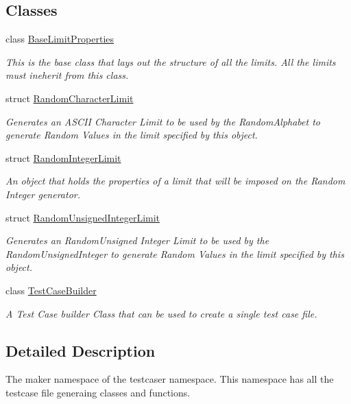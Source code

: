 \subsection*{Classes}
\begin{DoxyCompactItemize}
\item 
class \mbox{\hyperlink{classtestcaser_1_1maker_1_1BaseLimitProperties}{Base\+Limit\+Properties}}
\begin{DoxyCompactList}\small\item\em This is the base class that lays out the structure of all the limits. All the limits must ineherit from this class. \end{DoxyCompactList}\item 
struct \mbox{\hyperlink{structtestcaser_1_1maker_1_1RandomCharacterLimit}{Random\+Character\+Limit}}
\begin{DoxyCompactList}\small\item\em Generates an A\+S\+C\+II Character Limit to be used by the Random\+Alphabet to generate Random Values in the limit specified by this object. \end{DoxyCompactList}\item 
struct \mbox{\hyperlink{structtestcaser_1_1maker_1_1RandomIntegerLimit}{Random\+Integer\+Limit}}
\begin{DoxyCompactList}\small\item\em An object that holds the properties of a limit that will be imposed on the Random Integer generator. \end{DoxyCompactList}\item 
struct \mbox{\hyperlink{structtestcaser_1_1maker_1_1RandomUnsignedIntegerLimit}{Random\+Unsigned\+Integer\+Limit}}
\begin{DoxyCompactList}\small\item\em Generates an Random\+Unsigned Integer Limit to be used by the Random\+Unsigned\+Integer to generate Random Values in the limit specified by this object. \end{DoxyCompactList}\item 
class \mbox{\hyperlink{classtestcaser_1_1maker_1_1TestCaseBuilder}{Test\+Case\+Builder}}
\begin{DoxyCompactList}\small\item\em A Test Case builder Class that can be used to create a single test case file. \end{DoxyCompactList}\end{DoxyCompactItemize}


\subsection{Detailed Description}
The maker namespace of the testcaser namespace. This namespace has all the testcase file generaing classes and functions. 

